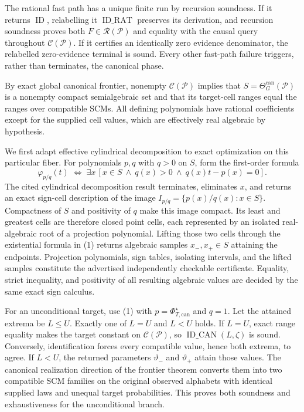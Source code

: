 The rational fast path has a unique finite run by recursion soundness.  If it returns \(\operatorname{ID}\), relabelling it \(\operatorname{ID\_RAT}\) preserves its derivation, and recursion soundness proves both \(F\in\mathscr R(\mathcal P)\) and equality with the causal query throughout \(\mathcal C(\mathcal P)\).  If it certifies an identically zero evidence denominator, the relabelled zero-evidence terminal is sound.  Every other fast-path failure triggers, rather than terminates, the canonical phase.

By exact global canonical frontier, nonempty \(\mathcal C(\mathcal P)\) implies that \(S=\Theta_G^{\mathrm{can}}(\mathcal P)\) is a nonempty compact semialgebraic set and that its target-cell ranges equal the ranges over compatible SCMs.  All defining polynomials have rational coefficients except for the supplied cell values, which are effectively real algebraic by hypothesis.

We first adapt effective cylindrical decomposition to exact optimization on this particular fiber.  For polynomials \(p,q\) with \(q>0\) on \(S\), form the first-order formula
\[
\varphi_{p/q}(t)\;\Longleftrightarrow\;
\exists x\,[x\in S\ \wedge\ q(x)>0\ \wedge\ q(x)t-p(x)=0].
\tag{1}
\]
The cited cylindrical decomposition result terminates, eliminates \(x\), and returns an exact sign-cell description of the image \(I_{p/q}=\{p(x)/q(x):x\in S\}\).  Compactness of \(S\) and positivity of \(q\) make this image compact.  Its least and greatest cells are therefore closed point cells, each represented by an isolated real-algebraic root of a projection polynomial.  Lifting those two cells through the existential formula in (1) returns algebraic samples \(x_-,x_+\in S\) attaining the endpoints.  Projection polynomials, sign tables, isolating intervals, and the lifted samples constitute the advertised independently checkable certificate.  Equality, strict inequality, and positivity of all resulting algebraic values are decided by the same exact sign calculus.

For an unconditional target, use (1) with \(p=\Phi_{T,\mathrm{can}}^\star\) and \(q=1\).  Let the attained extrema be \(L\leq U\).  Exactly one of \(L=U\) and \(L<U\) holds.  If \(L=U\), exact range equality makes the target constant on \(\mathcal C(\mathcal P)\), so \(\operatorname{ID\_CAN}(L,\zeta)\) is sound.  Conversely, identification forces every compatible value, hence both extrema, to agree.  If \(L<U\), the returned parameters \(\vartheta_-\) and \(\vartheta_+\) attain those values.  The canonical realization direction of the frontier theorem converts them into two compatible SCM families on the original observed alphabets with identical supplied laws and unequal target probabilities.  This proves both soundness and exhaustiveness for the unconditional branch.

